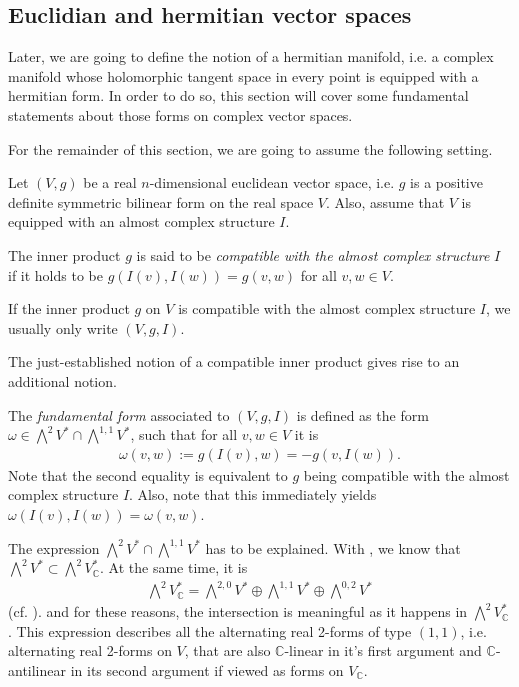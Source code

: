 \subsection{Euclidian and hermitian vector spaces}\;

Later, we are going to define the notion of a hermitian manifold, i.e. a complex manifold whose
holomorphic tangent space in every point is equipped with a hermitian form. In order to do so, this
section will cover some fundamental statements about those forms on complex vector spaces.

For the remainder of this section, we are going to assume the following setting.
\begin{set}
	Let $(V,g)$ be a real $n$-dimensional euclidean vector space, i.e. $g$ is a positive definite
	symmetric bilinear form on the real space $V$. Also, assume that $V$ is equipped with an almost
	complex structure $I$.
\end{set}
\begin{defn}
	The inner product $g$ is said to be \emph{compatible with the almost complex structure} $I$ if it
	holds to be $g(I(v),I(w)) = g(v,w)$ for all $v,w \in V$.
\end{defn}
\begin{nota}
	If the inner product $g$ on $V$ is compatible with the almost complex structure $I$, we usually
	only write $(V,g,I)$.
\end{nota}
The just-established notion of a compatible inner product gives rise to an additional notion.
\begin{defn}
	The \emph{fundamental form} associated to $(V,g,I)$ is defined as the form $\omega \in
	\bigwedge^2V^* \cap \bigwedge^{1,1} V^*$, such that for all $v,w \in V$ it is
	\begin{align*}
		\omega(v,w) := g(I(v),w) = - g(v, I(w)).
	\end{align*}
	Note that the second equality is equivalent to $g$ being compatible with the almost complex
	structure $I$. Also, note that this immediately yields $\omega(I(v),I(w)) = \omega(v,w)$.
\end{defn}
\begin{rem}
	The expression $ \bigwedge^2V^* \cap \bigwedge^{1,1} V^*$ has to be explained. With
	, we know that 
	$\bigwedge^2 V^*\subset \bigwedge^2 V_\mathbb{C}^*$. At the same time, it is
	\begin{align}
		\label{loc-theory:eq:decomps-of-complex-2-forms}
		\bigwedge\nolimits^2 V_\mathbb{C}^* = \bigwedge\nolimits^{2,0} V^* \oplus \bigwedge\nolimits^{1,1}
		V^* \oplus \bigwedge\nolimits^{0,2} V^*
	\end{align}
	(cf. \cite[Proposition 1.2.8 (ii), Example 1.2.34]{Huybrechts2004}).
	and for these reasons, the intersection is meaningful as it happens in $\bigwedge^2V^*_\mathbb{C}$.
	This expression describes all the alternating real 2-forms of type $(1,1)$, i.e. alternating real
	2-forms on $V$, that are also $\mathbb{C}$-linear in it's first argument and $\mathbb{C}$-antilinear
	in its second argument if viewed as forms on $V_\mathbb{C}$.
\end{rem}
